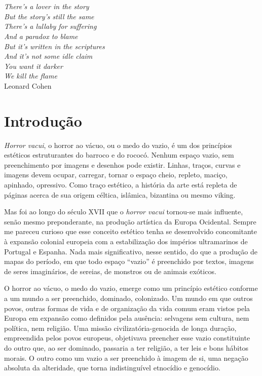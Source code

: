 
\chapter*{}
\thispagestyle{empty}
\begin{vplace}[30]
\begin{flushright}
\emph{There's a lover in the story\\
But the story's still the same\\
There's a lullaby for suffering\\
And a paradox to blame\\
But it's written in the scriptures\\
And it's not some idle claim\\
You want it darker\\
We kill the flame}\\[5pt]
Leonard Cohen
\end{flushright}
\end{vplace}

\chapter{Introdução}

\emph{Horror vacui}, o horror ao vácuo, ou o medo do vazio, é um dos
princípios estéticos estruturantes do barroco e do rococó. Nenhum espaço
vazio, sem preenchimento por imagens e desenhos pode existir. Linhas,
traços, curvas e imagens devem ocupar, carregar, tornar o espaço cheio,
repleto, maciço, apinhado, opressivo. Como traço estético, a história da
arte está repleta de páginas acerca de sua origem céltica, islâmica,
bizantina ou mesmo viking.

Mas foi ao longo do século XVII que o \emph{horror vacui} tornou-se mais
influente, senão mesmo preponderante, na produção artística da Europa
Ocidental. Sempre me pareceu curioso que esse conceito estético tenha se
desenvolvido concomitante à expansão colonial europeia com a
estabilização dos impérios ultramarinos de Portugal e Espanha. Nada mais
significativo, nesse sentido, do que a produção de mapas do período, em
que todo espaço ``vazio'' é preenchido por textos, imagens de seres
imaginários, de sereias, de monstros ou de animais exóticos.

O horror ao vácuo, o medo do vazio, emerge como um princípio estético
conforme a um mundo a ser preenchido, dominado, colonizado. Um mundo em
que outros povos, outras formas de vida e de organização da vida comum
eram vistos pela Europa em expansão como definidos pela ausência:
selvagens sem cultura, nem política, nem religião. Uma missão
civilizatória-genocida de longa duração, empreendida pelos povos
europeus, objetivava preencher esse vazio constituinte do outro que, ao
ser dominado, passaria a ter religião, a ter leis e bons hábitos morais.
O outro como um vazio a ser preenchido à imagem de si, uma negação
absoluta da alteridade, que torna indistinguível etnocídio e genocídio.

